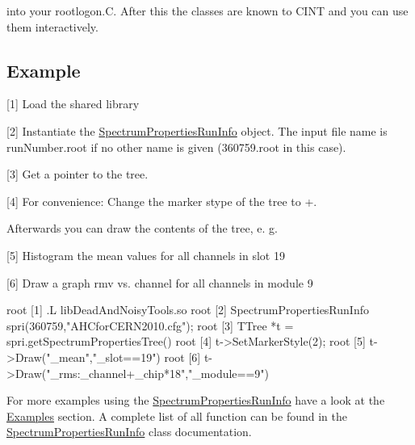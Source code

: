  into your rootlogon.\-C. After this the classes are known to C\-I\-N\-T and you can use them interactively.\hypertarget{root_lib_Example}{}\subsection{Example}\label{root_lib_Example}
\begin{DoxyItemize}
\item \mbox{[}1\mbox{]} Load the shared library \item \mbox{[}2\mbox{]} Instantiate the \hyperlink{class_spectrum_properties_run_info}{Spectrum\-Properties\-Run\-Info} object. The input file name is {\ttfamily run\-Number.\-root} if no other name is given (360759.\-root in this case). \item \mbox{[}3\mbox{]} Get a pointer to the tree. \item \mbox{[}4\mbox{]} For convenience\-: Change the marker stype of the tree to {\ttfamily +}.\end{DoxyItemize}
Afterwards you can draw the contents of the tree, e. g. \begin{DoxyItemize}
\item \mbox{[}5\mbox{]} Histogram the mean values for all channels in slot 19 \item \mbox{[}6\mbox{]} Draw a graph rmv vs. channel for all channels in module 9\end{DoxyItemize}
\begin{DoxyVerb}root [1] .L libDeadAndNoisyTools.so
root [2] SpectrumPropertiesRunInfo spri(360759,"AHCforCERN2010.cfg");
root [3] TTree *t = spri.getSpectrumPropertiesTree()
root [4] t->SetMarkerStyle(2);
root [5] t->Draw("_mean","_slot==19")
root [6] t->Draw("_rms:_channel+_chip*18","_module==9")
\end{DoxyVerb}


For more examples using the \hyperlink{class_spectrum_properties_run_info}{Spectrum\-Properties\-Run\-Info} have a look at the \hyperlink{_examples}{Examples} section. A complete list of all function can be found in the \hyperlink{class_spectrum_properties_run_info}{Spectrum\-Properties\-Run\-Info} class documentation. 